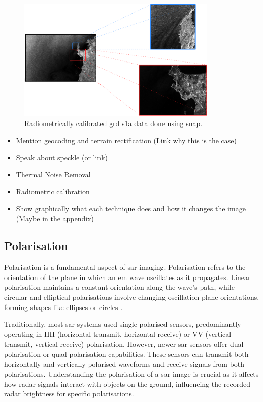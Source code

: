 \begin{figure}[H]
    \centering
    \includegraphics[width=0.85\textwidth]{Figures/Theory/radiometricCalibratedSARData.pdf}
    \caption{Radiometrically calibrated \acs{grd} \acs{s1a} data done using \acs{snap}.}
    \label{fig:theory.data.radiometric}
\end{figure}

\begin{itemize}
    \item Mention geocoding and terrain rectification (Link why this is the case)
    \item Speak about speckle (or link)
    \item Thermal Noise Removal
    \item Radiometric calibration
    \item Show graphically what each technique does and how it changes the image (Maybe in the appendix)
\end{itemize}

\subsection{Polarisation} \label{subsec:theory.sar.polarisation}

Polarisation is a fundamental aspect of \acs{sar} imaging. Polarisation refers to the orientation of the plane in which an \acs{em} wave oscillates as it propagates. Linear polarisation maintains a constant orientation along the wave's path, while circular and elliptical polarisations involve changing oscillation plane orientations, forming shapes like ellipses or circles \cite{Meyer2019}.

Traditionally, most \acs{sar} systems used single-polarised sensors, predominantly operating in HH (horizontal transmit, horizontal receive) or VV (vertical transmit, vertical receive) polarisation. However, newer \acs{sar} sensors offer dual-polarisation or quad-polarisation capabilities. These sensors can transmit both horizontally and vertically polarised waveforms and receive signals from both polarisations. Understanding the polarisation of a \acs{sar} image is crucial as it affects how radar signals interact with objects on the ground, influencing the recorded radar brightness for specific polarisations.

